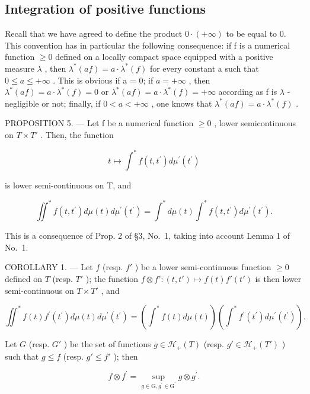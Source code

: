 \subsection{Integration of positive functions}

Recall that we have agreed to define the product \(0 \cdot (+\infty)\) to be equal to 0. This convention has in particular the following consequence: if f is a numerical function \(\geqslant 0\) defined on a locally compact space equipped with a positive measure \(\lambda\) , then \(\lambda^{*}(af) = a \cdot \lambda^{*}(f)\) for every constant a such that \(0 \leqslant a \leqslant +\infty\) . This is obvious if a = 0; if \(a = +\infty\) , then \(\lambda^{*}(af) = a \cdot \lambda^{*}(f) = 0\) or \(\lambda^{*}(af) = a \cdot \lambda^{*}(f) = +\infty\) according as f is \(\lambda\) -negligible or not; finally, if \(0 < a < +\infty\) , one knows that \(\lambda^{*}(af) = a \cdot \lambda^{*}(f)\) .

PROPOSITION 5. --- Let f be a numerical function \(\geqslant 0\) , lower semicontinuous on \(T \times T'\) . Then, the function

\[
t \mapsto \int^ {*} f (t, t ^ {\prime}) d \mu^ {\prime} (t ^ {\prime})
\]

is lower semi-continuous on T, and

\[
\iint^ {*} f (t, t ^ {\prime}) d \mu (t) d \mu^ {\prime} (t ^ {\prime}) = \int^ {*} d \mu (t) \int^ {*} f (t, t ^ {\prime}) d \mu^ {\prime} (t ^ {\prime}).\tag{3}
\]

This is a consequence of Prop. 2 of §3, No.~1, taking into account Lemma 1 of No.~1.

COROLLARY 1. --- Let \(f\) (resp. \(f'\) ) be a lower semi-continuous function \(\geqslant 0\) defined on \(T\) (resp. \(T'\) ); the function \(f \otimes f': (t, t') \mapsto f(t)f'(t')\) is then lower semi-continuous on \(T \times T'\) , and

\[
\iint^ {*} f (t) f ^ {\prime} \left(t ^ {\prime}\right) d \mu (t) d \mu^ {\prime} \left(t ^ {\prime}\right) = \left(\int^ {*} f (t) d \mu (t)\right) \left(\int^ {*} f ^ {\prime} \left(t ^ {\prime}\right) d \mu^ {\prime} \left(t ^ {\prime}\right)\right).\tag{6}
\]

Let \(G\) (resp. \(G'\) ) be the set of functions \(g \in \mathcal{H}_{+}(T)\) (resp. \(g' \in \mathcal{H}_{+}(T')\) ) such that \(g \leqslant f\) (resp. \(g' \leqslant f'\) ); then

\[
f \otimes f ^ {\prime} = \sup _ {g \in \mathrm{G}, g ^ {\prime} \in \mathrm{G} ^ {\prime}} g \otimes g ^ {\prime}.
\]

